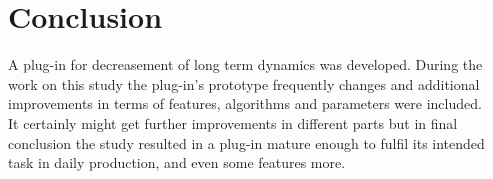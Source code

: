 \section{Conclusion}

A plug-in for decreasement of long term dynamics was developed. During the work on this study the plug-in’s prototype frequently changes and additional improvements in terms of features, algorithms and parameters were included.\\
It certainly might get further improvements in different parts but in final conclusion the study resulted in a plug-in mature enough to fulfil its intended task in daily production, and even some features more.\\



